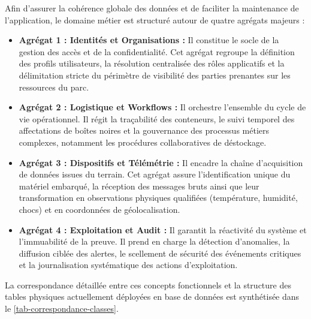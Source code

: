 Afin d'assurer la cohérence globale des données et de faciliter la maintenance de l'application, le domaine métier est structuré autour de quatre agrégats majeurs :

\begin{itemize}
    \item \textbf{Agrégat 1 : Identités et Organisations :} Il constitue le socle de la gestion des accès et de la confidentialité. Cet agrégat regroupe la définition des profils utilisateurs, la résolution centralisée des rôles applicatifs et la délimitation stricte du périmètre de visibilité des parties prenantes sur les ressources du parc.
    
    \item \textbf{Agrégat 2 : Logistique et Workflows :} Il orchestre l'ensemble du cycle de vie opérationnel. Il régit la traçabilité des conteneurs, le suivi temporel des affectations de boîtes noires et la gouvernance des processus métiers complexes, notamment les procédures collaboratives de déstockage.
    
    \item \textbf{Agrégat 3 : Dispositifs et Télémétrie :} Il encadre la chaîne d'acquisition de données issues du terrain. Cet agrégat assure l'identification unique du matériel embarqué, la réception des messages bruts ainsi que leur transformation en observations physiques qualifiées (température, humidité, chocs) et en coordonnées de géolocalisation.
    
    \item \textbf{Agrégat 4 : Exploitation et Audit :} Il garantit la réactivité du système et l'immuabilité de la preuve. Il prend en charge la détection d'anomalies, la diffusion ciblée des alertes, le scellement de sécurité des événements critiques et la journalisation systématique des actions d'exploitation.
\end{itemize}

La correspondance détaillée entre ces concepts fonctionnels et la structure des tables physiques actuellement déployées en base de données est synthétisée dans le \cref{tab-correspondance-classes}.


